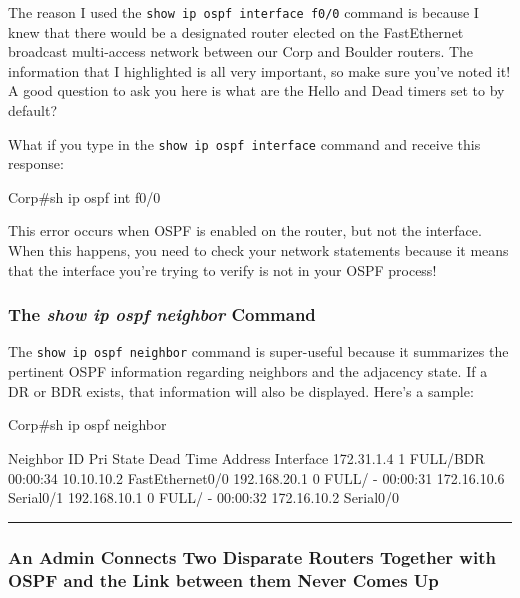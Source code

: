 The reason I used the \texttt{show\ ip\ ospf\ interface\ f0/0} command
is because I knew that there would be a designated router elected on the
FastEthernet broadcast multi-access network between our Corp and Boulder
routers. The information that I highlighted is all very important, so
make sure you've noted it! A good question to ask you here is what are
the Hello and Dead timers set to by default?

What if you type in the \texttt{show\ ip\ ospf\ interface} command and
receive this response:

\begin{cli}
Corp#sh ip ospf int f0/0
\end{cli}

This error occurs when OSPF is enabled on the router, but not the
interface. When this happens, you need to check your network statements
because it means that the interface you're trying to verify is not in
your OSPF process!

\subsubsection[The \emph{show ip ospf neighbor}
Command]{\texorpdfstring{\protect\hypertarget{c18.xhtmlux5cux23c18-sec-15}{}{}The
\emph{show ip ospf neighbor}
Command}{The show ip ospf neighbor Command}}

The \texttt{show\ ip\ ospf\ neighbor} command is super-useful because it
summarizes the pertinent OSPF information regarding neighbors and the
adjacency state. If a DR or BDR exists, that information will also be
displayed. Here's a sample:

\begin{cli}
Corp#sh ip ospf neighbor

Neighbor ID     Pri   State      Dead Time   Address         Interface
172.31.1.4        1   FULL/BDR   00:00:34    10.10.10.2     FastEthernet0/0
192.168.20.1      0   FULL/  -   00:00:31    172.16.10.6     Serial0/1
192.168.10.1      0   FULL/  -   00:00:32    172.16.10.2     Serial0/0
\end{cli}

\begin{center}\rule{0.5\linewidth}{0.5pt}\end{center}

\subsubsection[\hfill\break
An Admin Connects Two Disparate Routers Together with OSPF and the Link
between them Never Comes
Up]{\texorpdfstring{%
An Admin Connects Two Disparate Routers Together with OSPF and the Link
between them Never Comes
Up}{ An Admin Connects Two Disparate Routers Together with OSPF and the Link between them Never Comes Up}}

